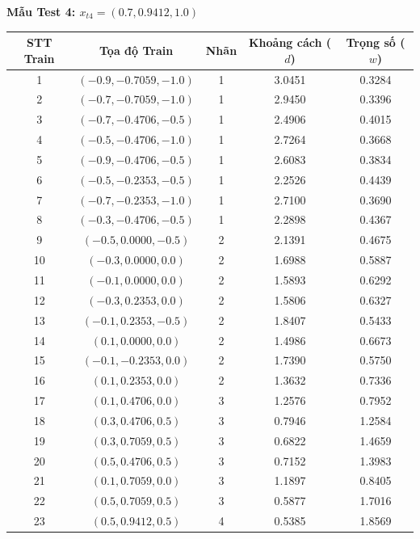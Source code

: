 \documentclass[12pt,a4paper]{article}
\begin{document}
\newpage
\textbf{Mẫu Test 4: $x_{t4} = (0.7, 0.9412, 1.0)$}
\begin{table}[H]
\centering
\footnotesize
\renewcommand{\arraystretch}{0.85}
\begin{tabular}{|c|c|c|c|c|}
\hline
\textbf{STT Train} & \textbf{Tọa độ Train} & \textbf{Nhãn} & \textbf{Khoảng cách ($d$)} & \textbf{Trọng số ($w$)} \\ \hline
1 & $(-0.9, -0.7059, -1.0)$ & 1 & 3.0451 & 0.3284 \\ \hline
2 & $(-0.7, -0.7059, -1.0)$ & 1 & 2.9450 & 0.3396 \\ \hline
3 & $(-0.7, -0.4706, -0.5)$ & 1 & 2.4906 & 0.4015 \\ \hline
4 & $(-0.5, -0.4706, -1.0)$ & 1 & 2.7264 & 0.3668 \\ \hline
5 & $(-0.9, -0.4706, -0.5)$ & 1 & 2.6083 & 0.3834 \\ \hline
6 & $(-0.5, -0.2353, -0.5)$ & 1 & 2.2526 & 0.4439 \\ \hline
7 & $(-0.7, -0.2353, -1.0)$ & 1 & 2.7100 & 0.3690 \\ \hline
8 & $(-0.3, -0.4706, -0.5)$ & 1 & 2.2898 & 0.4367 \\ \hline
9 & $(-0.5, 0.0000, -0.5)$ & 2 & 2.1391 & 0.4675 \\ \hline
10 & $(-0.3, 0.0000, 0.0)$ & 2 & 1.6988 & 0.5887 \\ \hline
11 & $(-0.1, 0.0000, 0.0)$ & 2 & 1.5893 & 0.6292 \\ \hline
12 & $(-0.3, 0.2353, 0.0)$ & 2 & 1.5806 & 0.6327 \\ \hline
13 & $(-0.1, 0.2353, -0.5)$ & 2 & 1.8407 & 0.5433 \\ \hline
14 & $(0.1, 0.0000, 0.0)$ & 2 & 1.4986 & 0.6673 \\ \hline
15 & $(-0.1, -0.2353, 0.0)$ & 2 & 1.7390 & 0.5750 \\ \hline
16 & $(0.1, 0.2353, 0.0)$ & 2 & 1.3632 & 0.7336 \\ \hline
17 & $(0.1, 0.4706, 0.0)$ & 3 & 1.2576 & 0.7952 \\ \hline
18 & $(0.3, 0.4706, 0.5)$ & 3 & 0.7946 & 1.2584 \\ \hline
19 & $(0.3, 0.7059, 0.5)$ & 3 & 0.6822 & 1.4659 \\ \hline
20 & $(0.5, 0.4706, 0.5)$ & 3 & 0.7152 & 1.3983 \\ \hline
21 & $(0.1, 0.7059, 0.0)$ & 3 & 1.1897 & 0.8405 \\ \hline
22 & $(0.5, 0.7059, 0.5)$ & 3 & 0.5877 & 1.7016 \\ \hline
23 & $(0.5, 0.9412, 0.5)$ & 4 & 0.5385 & 1.8569 \\ \hline

\end{tabular}
\end{table}
\end{document}

